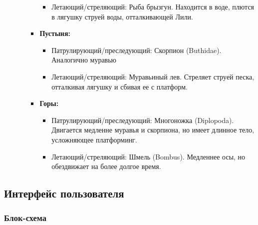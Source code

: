 \documentclass{article}
\begin{document}
\begin{enumerate}
\begin{itemize}
\begin{itemize}
\begin{itemize}
                \item Летающий/стреляющий: Рыба брызгун. Находится в воде, плются в лягушку струей воды, отталкивающей Лили.
            \end {itemize}
            \item \textbf{Пустыня:}
            \begin{itemize}
                \item Патрулирующий/преследующий: Скорпион (Buthidae). Аналогично муравью
                \item Летающий/стреляющий: Муравьиный лев. Стреляет струей песка, отталкивая лягушку и сбивая ее с платформ.
            \end {itemize}
            \item \textbf{Горы:}
            \begin{itemize}
                \item Патрулирующий/преследующий: Многоножка (Diplopoda). Двигается медленне муравья и скорпиона, но имеет длинное тело, усложняющее платформинг.
                \item Летающий/стреляющий: Шмель (Bombus). Медленнее осы, но обездвижает на более долгое время.
            \end {itemize}
        \end {itemize}
        \end{itemize}
\end{enumerate}

\subsection{Интерфейс пользователя}

\subsubsection{Блок-схема}
\end{document}
